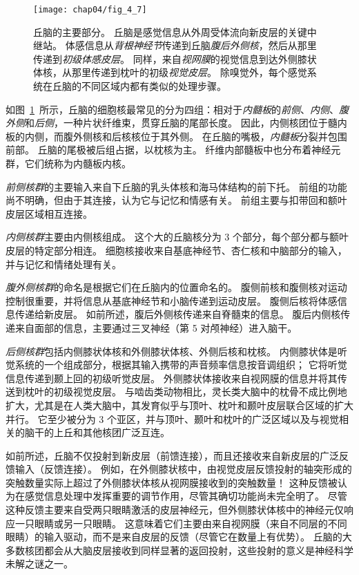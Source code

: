 \begin{figure}[htbp]
	\centering
	\texttt{[image: chap04/fig\_4\_7]}
	\caption{丘脑的主要部分。
		丘脑是感觉信息从外周受体流向新皮层的关键中继站。
		体感信息从\textit{背根神经节}传递到丘脑\textit{腹后外侧核}，然后从那里传递到\textit{初级体感皮层}。
		同样，来自\textit{视网膜}的视觉信息到达外侧膝状体核，从那里传递到枕叶的初级\textit{视觉皮层}。
		除嗅觉外，每个感觉系统在丘脑的不同区域内都有类似的处理步骤。}
	\label{fig:4_7}
\end{figure}


如图~\ref{fig:4_7}~所示，丘脑的细胞核最常见的分为四组：相对于\textit{内髓板}的\textit{前侧}、\textit{内侧}、\textit{腹外侧}和\textit{后侧}，一种片状纤维束，贯穿丘脑的尾部长度。
因此，内侧核团位于髓内板的内侧，而腹外侧核和后核核位于其外侧。
在丘脑的嘴极，\textit{内髓板}分裂并包围前部。
丘脑的尾极被后组占据，以枕核为主。
纤维内部髓板中也分布着神经元群，它们统称为内髓板内核。


\textit{前侧核群}的主要输入来自下丘脑的乳头体核和海马体结构的前下托。
前组的功能尚不明确，但由于其连接，认为它与记忆和情感有关。
前组主要与扣带回和额叶皮层区域相互连接。


\textit{内侧核群}主要由内侧核组成。
这个大的丘脑核分为 3 个部分，每个部分都与额叶皮层的特定部分相连。
细胞核接收来自基底神经节、杏仁核和中脑部分的输入，并与记忆和情绪处理有关。


\textit{腹外侧核群}的命名是根据它们在丘脑内的位置命名的。
腹侧前核和腹侧核对运动控制很重要，并将信息从基底神经节和小脑传递到运动皮层。
腹侧后核将体感信息传递给新皮层。
如前所述，腹后外侧核传递来自脊髓束的信息。
腹后内侧核传递来自面部的信息，主要通过三叉神经（第 5 对颅神经）进入脑干。


\textit{后侧核群}包括内侧膝状体核和外侧膝状体核、外侧后核和枕核。
内侧膝状体是听觉系统的一个组成部分，根据其输入携带的声音频率信息按音调组织；
它将听觉信息传递到颞上回的初级听觉皮层。
外侧膝状体接收来自视网膜的信息并将其传送到枕叶的初级视觉皮层。
与啮齿类动物相比，灵长类大脑中的枕骨不成比例地扩大，尤其是在人类大脑中，其发育似乎与顶叶、枕叶和颞叶皮层联合区域的扩大并行。
它至少被分为 3 个亚区，并与顶叶、颞叶和枕叶的广泛区域以及与视觉相关的脑干的上丘和其他核团广泛互连。


如前所述，丘脑不仅投射到新皮层（前馈连接），而且还接收来自新皮层的广泛反馈输入（反馈连接）。 
例如，在外侧膝状核中，由视觉皮层反馈投射的轴突形成的突触数量实际上超过了外侧膝状体核从视网膜接收到的突触数量！ 
这种反馈被认为在感觉信息处理中发挥重要的调节作用，尽管其确切功能尚未完全明了。
尽管这种反馈主要来自受两只眼睛激活的皮层神经元，但外侧膝状体核中的神经元仅响应一只眼睛或另一只眼睛。 
这意味着它们主要由来自视网膜（来自不同层的不同眼睛）的输入驱动，而不是来自皮层的反馈（尽管它在数量上有优势）。
丘脑的大多数核团都会从大脑皮层接收到同样显著的返回投射，这些投射的意义是神经科学未解之谜之一。


